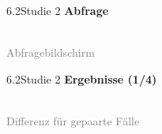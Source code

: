 \documentclass[xcolor=table,9pt,aspectratio=169]{beamer}
\begin{document}
\begin{frame}{\vspace*{10mm}6.2\hspace*{1em}Studie 2}
\textbf{Abfrage}\\
\bigskip
\begin{center}
   \\
   \footnotesize{\textcolor{gray}{Abfragebildschirm}}
\end{center}
\end{frame}


\begin{frame}{\vspace*{10mm}6.2\hspace*{1em}Studie 2}
\textbf{Ergebnisse (1/4)}\\
\bigskip
\begin{center}
   \\
   \footnotesize{\textcolor{gray}{Differenz für gepaarte Fälle}}
\end{center}
\end{frame}
\end{document}
